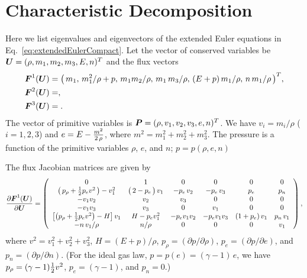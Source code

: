 \documentclass[10pt,preprint]{aastex}
\begin{document}
\section{Characteristic Decomposition}
\label{app:Characteristic}

Here we list eigenvalues and eigenvectors of the extended Euler equations in Eq.~\eqref{eq:extendedEulerCompact}.  
Let the vector of conserved variables be $\boldsymbol{U}=(\rho,m_{1},m_{2},m_{3},E,n)^{T}$ and the flux vectors
\begin{align}
  \boldsymbol{F}^{1}(\boldsymbol{U})
  &=\big(\,m_{1},\,m_{1}^{2}/\rho+p,\,m_{1}m_{2}/\rho,\,m_{1}\,m_{3}/\rho,\,(E+p)\,m_{1}/\rho,\,n\,m_{1}/\rho\,\big)^{T}, \\
  \boldsymbol{F}^{2}(\boldsymbol{U})
  &=, \\
  \boldsymbol{F}^{3}(\boldsymbol{U})
  &=.
\end{align}
The vector of primitive variables is $\boldsymbol{P}=(\rho,v_{1},v_{2},v_{3},e,n)^{T}$.  
We have $v_{i}=m_{i}/\rho$ ($i=1,2,3$) and $e=E-\frac{m^{2}}{2\,\rho}$, where $m^{2}=m_{1}^{2}+m_{2}^{2}+m_{3}^{2}$.  
The pressure is a function of the primitive variables $\rho$, $e$, and $n$; $p=p(\rho,e,n)$

The flux Jacobian matrices are given by
\begin{align}
  \frac{\partial \boldsymbol{F}^{1}(\boldsymbol{U})}{\partial \boldsymbol{U}}
  =
  \left(
  \begin{array}{cccccc}
  0 & 1 & 0 & 0 & 0 & 0 \\
  \big(\,p_{\rho}+\frac{1}{2}p_{e}v^{2}\,\big)-v_{1}^{2} & \big(\,2-p_{e}\,\big)\,v_{1} & -p_{e}\,v_{2} & -p_{e}\,v_{3} & p_{e} & p_{n} \\
  - v_{1}v_{2} & v_{2} & v_{3} & 0 & 0 & 0 \\
  - v_{1}v_{3} & v_{3} & 0 & v_{1} & 0 & 0 \\
  \big[\big(p_{\rho}+\frac{1}{2}p_{e}v^{2}\big)-H\big]\,v_{1} & H-p_{e}v_{1}^{2} & -p_{e}v_{1}v_{2} & -p_{e}v_{1}v_{3} & (1+p_{e})\,v_{1} & p_{n}\,v_{1} \\
  -n\,v_{1}/\rho & n/\rho & 0 & 0 & 0 & v_{1}
  \end{array}
  \right),
\end{align}
where $v^{2}=v_{1}^{2}+v_{2}^{2}+v_{3}^{2}$, $H=(E+p)/\rho$, $p_{\rho}=(\partial p/\partial \rho)$, $p_{e}=(\partial p/\partial e)$, and $p_{n}=(\partial p/\partial n)$.  
(For the ideal gas law, $p=p(e)=(\gamma-1)\,e$, we have $p_{\rho}=(\gamma-1)\frac{1}{2}v^{2}$, $p_{e}=(\gamma-1)$, and $p_{n}=0$.)
\end{document}
